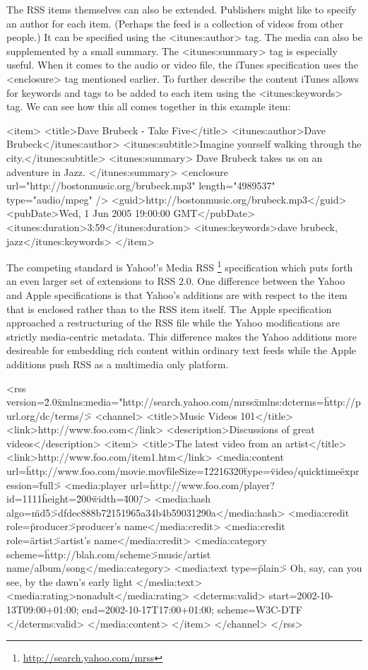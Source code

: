 \documentclass[a4paper,12pt]{report}
\begin{document}
The RSS items themselves can also be extended.
Publishers might like to specify an author for each item. (Perhaps the feed is a collection of videos from other people.)
It can be specified using the <itunes:author> tag.
The media can also be supplemented by a small summary.
The <itunes:summary> tag is especially useful.
When it comes to the audio or video file, the iTunes specification uses the <enclosure> tag mentioned earlier.
To further describe the content iTunes allows for keywords and tags to be added to each item using the <itunes:keywords> tag.
We can see how this all comes together in this example item:

	<item>
		<title>Dave Brubeck - Take Five</title>
		<itunes:author>Dave Brubeck</itunes:author>
		<itunes:subtitle>Imagine yourself walking through the city.</itunes:subtitle>
		<itunes:summary>
			Dave Brubeck takes us on an adventure in Jazz.
		</itunes:summary>
		<enclosure url="http://bostonmusic.org/brubeck.mp3" length="4989537" type="audio/mpeg" />
		<guid>http://bostonmusic.org/brubeck.mp3</guid>
		<pubDate>Wed, 1 Jun 2005 19:00:00 GMT</pubDate>
		<itunes:duration>3:59</itunes:duration>
		<itunes:keywords>dave brubeck, jazz</itunes:keywords>
	</item>

The competing standard is Yahoo!'s Media RSS \footnote{\url{http://search.yahoo.com/mrss}} specification which puts forth an even larger set of extensions to RSS 2.0.
One difference between the Yahoo and Apple specifications is that Yahoo's additions are with respect to the item that is enclosed rather than to the RSS item itself.
The Apple specification approached a restructuring of the RSS file while the Yahoo modifications are strictly media-centric metadata.
This difference makes the Yahoo additions more desireable for embedding rich content within ordinary text feeds while the Apple additions push RSS as a multimedia only platform.

<rss version=\"2.0\" xmlns:media="http://search.yahoo.com/mrss\"
xmlns:dcterms=\"http://purl.org/dc/terms/\">
<channel>
<title>Music Videos 101</title>
<link>http://www.foo.com</link>
<description>Discussions of great videos</description>
	<item>
		<title>The latest video from an artist</title>
		<link>http://www.foo.com/item1.htm</link>
		<media:content url=\"http://www.foo.com/movie.mov\" fileSize=\"12216320\" 
		type=\"video/quicktime\" expression=\"full\">
		<media:player url=\"http://www.foo.com/player?id=1111\" 
		height=\"200\" width=\"400\"/>
		<media:hash algo=\"md5\">dfdec888b72151965a34b4b59031290a</media:hash>
		<media:credit role=\"producer\">producer's name</media:credit>
		<media:credit role=\"artist\">artist's name</media:credit>
		<media:category scheme=\"http://blah.com/scheme\">music/artist 
		name/album/song</media:category>
		<media:text type=\"plain\">
		Oh, say, can you see, by the dawn's early light
		</media:text>
		<media:rating>nonadult</media:rating>
		<dcterms:valid>
			start=2002-10-13T09:00+01:00;
			end=2002-10-17T17:00+01:00;
			scheme=W3C-DTF
		</dcterms:valid>
		</media:content>
	</item>
</channel>
</rss>
\end{document}
